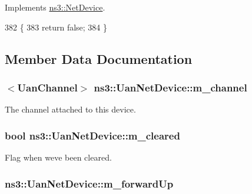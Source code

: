 Implements \hyperlink{classns3_1_1NetDevice_a04793d220b54c40e110ebf86dae5b25c}{ns3\+::\+Net\+Device}.


\begin{DoxyCode}
382 \{
383   \textcolor{keywordflow}{return} \textcolor{keyword}{false};
384 \}
\end{DoxyCode}


\subsection{Member Data Documentation}
\subsubsection[{\texorpdfstring{m\+\_\+channel}{m_channel}}]{$<${\bf Uan\+Channel}$>$ ns3\+::\+Uan\+Net\+Device\+::m\+\_\+channel\hspace{0.3cm}{\ttfamily [private]}}\hypertarget{classns3_1_1UanNetDevice_ab528925b6ada30cd1e9a8acc23a4f9dd}{}\label{classns3_1_1UanNetDevice_ab528925b6ada30cd1e9a8acc23a4f9dd}


The channel attached to this device. 

\subsubsection[{\texorpdfstring{m\+\_\+cleared}{m_cleared}}]{\setlength{\rightskip}{0pt plus 5cm}bool ns3\+::\+Uan\+Net\+Device\+::m\+\_\+cleared\hspace{0.3cm}{\ttfamily [private]}}\hypertarget{classns3_1_1UanNetDevice_a94db1f444365c0961e0dc9b2faee00cf}{}\label{classns3_1_1UanNetDevice_a94db1f444365c0961e0dc9b2faee00cf}
Flag when we\textquotesingle{}ve been cleared. 
\subsubsection[{\texorpdfstring{m\+\_\+forward\+Up}{m_forwardUp}}]{ ns3\+::\+Uan\+Net\+Device\+::m\+\_\+forward\+Up\hspace{0.3cm}{\ttfamily [private]}}\hypertarget{classns3_1_1UanNetDevice_aee4321afad0167cdb8f3a6956be03983}{}\label{classns3_1_1UanNetDevice_aee4321afad0167cdb8f3a6956be03983}


